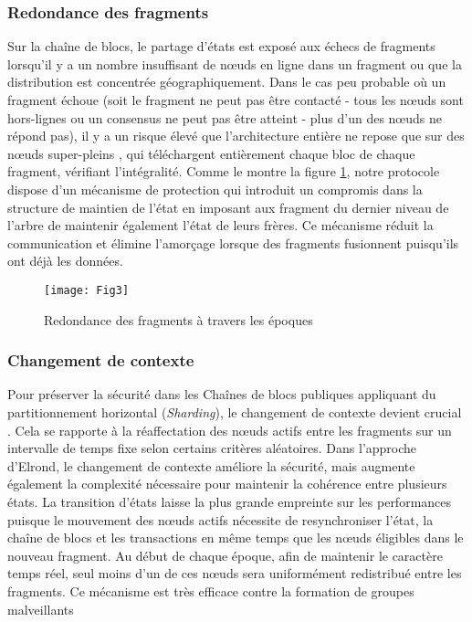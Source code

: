 \documentclass[journal]{IEEEtran}
\begin{document}
 
\subsubsection{Redondance des fragments}

Sur la chaîne  de blocs, le partage d'états est exposé aux échecs de fragments lorsqu'il y a un nombre insuffisant de nœuds en ligne dans un fragment ou que la distribution est concentrée géographiquement. Dans le cas peu probable où un fragment échoue (soit le fragment ne peut pas être contacté - tous les nœuds sont hors-lignes ou un consensus ne peut pas être atteint - plus d'un des nœuds ne répond pas), il y a un risque élevé que l'architecture entière ne repose que sur des nœuds super-pleins \cite{2}, qui téléchargent entièrement chaque bloc de chaque fragment, vérifiant l'intégralité. Comme le montre la figure \ref{Fig.3}, notre protocole dispose d'un mécanisme de protection qui introduit un compromis dans la structure de maintien de l'état en imposant aux fragment du dernier niveau de l'arbre de maintenir également l'état de leurs frères. Ce mécanisme réduit la communication et élimine l’amorçage lorsque des  fragments fusionnent puisqu'ils ont déjà les données.

\begin{figure}
	\texttt{[image: Fig3]} %
	\caption{Redondance des fragments à travers les époques} %
	\label{Fig.3} %
\end{figure}

\subsubsection{Changement de contexte}

Pour préserver la sécurité dans les Chaînes de blocs publiques appliquant du partitionnement horizontal (\textit{Sharding}), le changement de contexte devient crucial \cite{7}. Cela se rapporte à la réaffectation des nœuds actifs entre les fragments sur un intervalle de temps fixe selon certains critères aléatoires. Dans l'approche d'Elrond, le changement de contexte améliore la sécurité, mais augmente également la complexité nécessaire pour maintenir la cohérence entre plusieurs états. La transition d'états laisse la plus grande empreinte sur les performances puisque le mouvement des nœuds actifs nécessite de resynchroniser l'état, la chaîne de blocs et les transactions en même temps que les nœuds éligibles dans le nouveau fragment.
Au début de chaque époque, afin de maintenir le caractère temps réel, seul moins d'un de ces nœuds sera uniformément redistribué entre les fragments. Ce mécanisme est très efficace contre la formation de groupes malveillants
\end{document}
